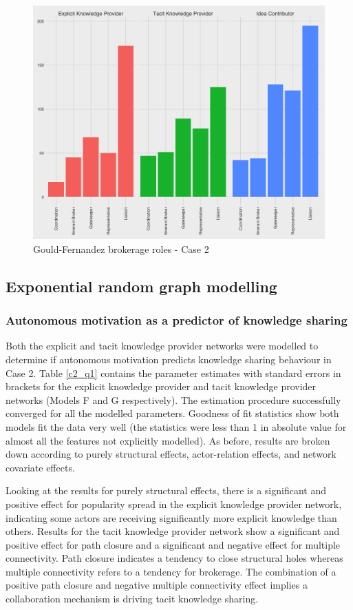 \begin{figure}
	\centering
	\includegraphics[width=0.7\linewidth]{Images/gf_brokerage_case2}
	\caption{Gould-Fernandez brokerage roles - Case 2}
	\label{fig:gfbrokeragecase2}
\end{figure}

\subsection{Exponential random graph modelling}

\subsubsection{Autonomous motivation as a predictor of knowledge sharing}

Both the explicit and tacit knowledge provider networks were modelled to determine if autonomous motivation predicts knowledge sharing behaviour in Case 2. Table \ref{c2_q1} contains the parameter estimates with standard errors in brackets for the explicit knowledge provider and tacit knowledge provider networks (Models F and G respectively). The estimation procedure successfully converged for all the modelled parameters. Goodness of fit statistics show both models fit the data very well (the statistics were less than 1 in absolute value for almost all the features not explicitly modelled). As before, results are broken down according to purely structural effects, actor-relation effects, and network covariate effects. \medskip

Looking at the results for purely structural effects, there is a significant and positive effect for popularity spread in the explicit knowledge provider network, indicating some actors are receiving significantly more explicit knowledge than others. Results for the tacit knowledge provider network show a significant and positive effect for path closure and a significant and negative effect for multiple connectivity. Path closure indicates a tendency to close structural holes whereas multiple connectivity refers to a tendency for brokerage. The combination of a positive path closure and negative multiple connectivity effect implies a collaboration mechanism is driving tacit knowledge sharing.\medskip

